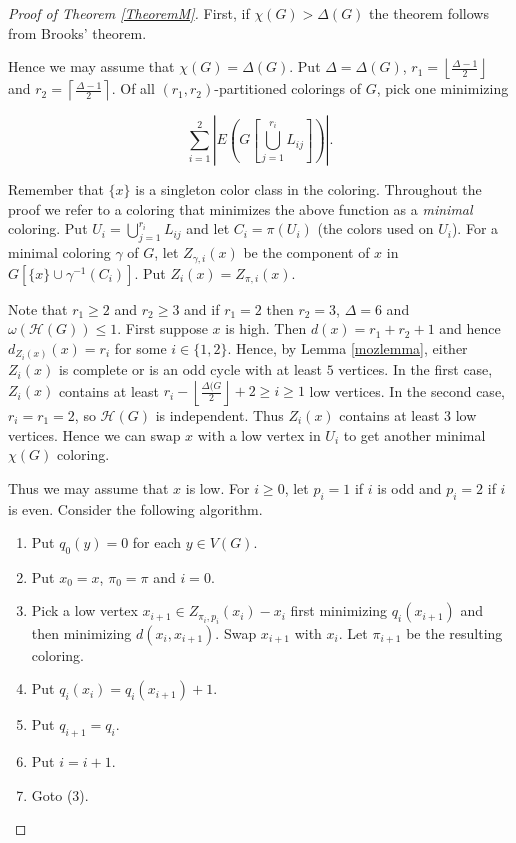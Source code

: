 \documentclass[11pt]{amsart}
\theoremstyle{plain}
\theoremstyle{definition}
\theoremstyle{remark}
\begin{document}
\begin{proof}[Proof of Theorem \ref{TheoremM}]
First, if $\chi(G) > \Delta(G)$ the theorem follows from Brooks' theorem.

Hence we may assume that $\chi(G) = \Delta(G)$.  Put $\Delta = \Delta(G)$, $r_1 = \left \lfloor \frac{\Delta - 1}{2} \right \rfloor$ and $r_2 = \left \lceil \frac{\Delta - 1}{2} \right \rceil$.  Of all $(r_1, r_2)$-partitioned colorings of $G$, pick one minimizing

\[\sum_{i = 1}^2 \left|E\left(G\left[\bigcup_{j = 1}^{r_i} L_{ij}\right]\right)\right|.\]

Remember that $\{x\}$ is a singleton color class in the coloring.  Throughout the proof we refer to a coloring that minimizes the above function as a \emph{minimal} coloring. Put $U_i = \bigcup_{j = 1}^{r_i} L_{ij}$ and let $C_i = \pi(U_i)$ (the colors used on $U_i$).  For a minimal coloring $\gamma$ of $G$, let $Z_{\gamma, i}(x)$ be the component of $x$ in $G[\{x\} \cup \gamma^{-1}(C_i)]$.  Put $Z_i(x) = Z_{\pi, i}(x)$.

Note that $r_1 \geq 2$ and $r_2 \geq 3$ and if $r_1 = 2$ then $r_2 = 3$, $\Delta = 6$ and $\omega(\mathcal{H}(G)) \leq 1$. First suppose $x$ is high. Then $d(x) = r_1 + r_2 + 1$ and hence $d_{Z_i(x)}(x) = r_i$ for some $i \in \{1,2\}$. Hence, by Lemma \ref{mozlemma}, either $Z_i(x)$ is complete or is an odd cycle with at least $5$ vertices. In the first case, $Z_i(x)$  contains at least $r_i - \left \lfloor \frac{\Delta(G}{2} \right \rfloor + 2 \geq i \geq 1$ low vertices.  In the second case, $r_i = r_1 = 2$, so $\mathcal{H}(G)$ is independent.  Thus $Z_i(x)$ contains at least $3$ low vertices.  Hence we can swap $x$ with a low vertex in $U_i$ to get another minimal $\chi(G)$ coloring.

Thus we may assume that $x$ is low.  For $i \geq 0$, let $p_i = 1$ if $i$ is odd and $p_i = 2$ if $i$ is even. Consider the following algorithm.
\begin{enumerate}
\item Put $q_0(y) = 0$ for each $y \in V(G)$.
\item Put $x_0 = x$, $\pi_0 = \pi$ and $i = 0$.
\item Pick a low vertex $x_{i + 1} \in Z_{\pi_i, p_i}(x_i) - x_i$ first minimizing $q_i(x_{i + 1})$ and then minimizing $d(x_i, x_{i + 1})$. Swap $x_{i + 1}$ with $x_i$. Let $\pi_{i+1}$ be the resulting coloring.
\item Put $q_i(x_i) = q_i(x_{i+1}) + 1$.
\item Put $q_{i+1} = q_i$.
\item Put $i = i + 1$.
\item Goto (3).
\end{enumerate}


\end{proof}
\end{document}
